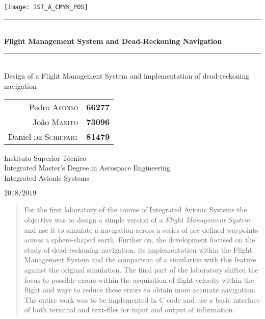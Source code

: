 \documentclass{article}
\begin{document}
\thispagestyle{empty}

\texttt{[image: IST\_A\_CMYK\_POS]}
	
\begin{center}
	\vspace{40mm} %
	\rule{\linewidth}{0.5pt} \\
    \vspace{2mm}
	\Huge \textbf{Flight Management System and Dead-Reckoning Navigation} \\
	\rule{\linewidth}{2pt} \\
	\vspace{8mm} %
	\Large Design of a Flight Management System and implementation of dead-reckoning navigation
	
	\vspace{\fill} %
	
	\normalsize
	\begin{tabular}{r l}
		Pedro \textsc{Afonso} & \textbf{66277} \\
		João \textsc{Manito} & \textbf{73096} \\
		Daniel \textsc{de Schiffart} & \textbf{81479}
	\end{tabular}
	
	\vspace{10mm} %
	\Large Instituto Superior Técnico \\
	Integrated Master's Degree in Aerospace Engineering \\
	\vspace{1mm}
	\large Integrated Avionic Systems
	
	\vspace{10mm} %
	\Large $2018/2019$
\end{center}

\pagebreak

{\hypersetup{linkcolor = black} \tableofcontents}

\pagebreak

\begin{abstract}
	For the first laboratory of the course of Integrated Avionic Systems the objective was to design a simple version of a \emph{Flight Management System} and use it to simulate a navigation across a series of pre-defined waypoints across a sphere-shaped earth. Further on, the development focused on the study of dead-reckoning navigation, its implementation within the Flight Management System and the comparison of a simulation with this feature against the original simulation. The final part of the laboratory shifted the focus to possible errors within the acquisition of flight velocity within the flight and ways to reduce these errors to obtain more accurate navigation. The entire work was to be implemented in C code and use a basic interface of both terminal and text-files for input and output of information.
\end{abstract}
\end{document}
